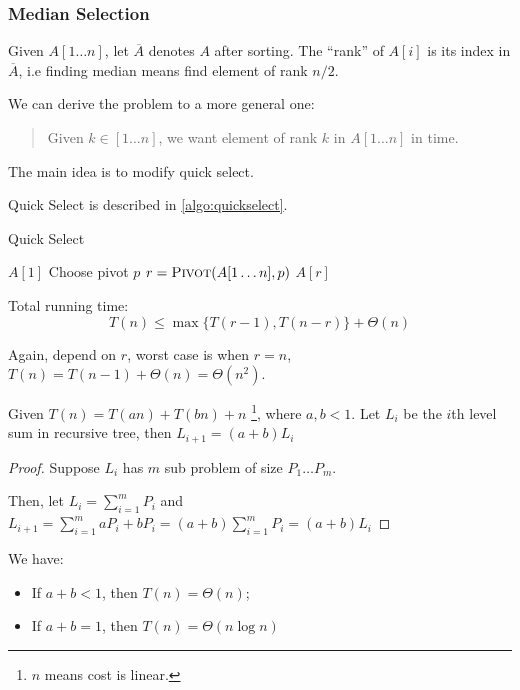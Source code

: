 \subsubsection{Median Selection}
Given $A[1 \ldots n]$, let $\overline{A}$ denotes $A$ after sorting.
The ``rank'' of $A[i]$ is its index in $\overline{A}$,
i.e finding median means find element of rank $n/2$.

We can derive the problem to a more general one:
\begin{quote}
    Given $k \in [1 \ldots n]$, we want element of rank $k$ in $A[1 \ldots n]$ in  time.
\end{quote}
The main idea is to modify quick select.

Quick Select is described in \cref{algo:quickselect}.

\begin{algorithm}[H]
    \caption{Quick Select}\label{algo:quickselect}
    \begin{algorithmic}
                \Return $A[1]$
            \Else
                \State Choose pivot $p$
                \State $r = \textsc{Pivot} (A[1 \ldots n], p)$
                    \Return {}
                    \Return {}
                \Else
                    \Return $A[r]$
                \EndIf
            \EndIf
        \EndProcedure
    \end{algorithmic}
\end{algorithm}

Total running time:
\[T(n) \leq \max\{T(r-1), T(n-r)\} + \Theta(n)\]

Again, depend on $r$, worst case is when $r=n$, $T(n) = T(n-1) + \Theta(n) = \Theta(n^2)$.

\Claim Given $T(n) = T(an) + T(bn) + n$
\footnote{$n$ means cost is linear.},
where $a,b<1$. Let $L_i$ be the $i$th level sum
in recursive tree, then $L_{i+1} = (a + b)L_i$

\begin{proof}
Suppose $L_i$ has $m$ sub problem of size $P_1 \ldots P_m$.

Then, let $\displaystyle L_i = \sum_{i=1}^m{P_i}$
and $\displaystyle L_{i+1} = \sum_{i=1}^m{aP_i+bP_i} = (a+b)\sum_{i=1}^m{P_i}=(a+b)L_i$
\end{proof}

We have:
\begin{itemize}
    \item If $a+b <1$, then $T(n) = \Theta(n)$;
    \item If $a+b =1$, then $T(n) = \Theta(n \log n)$
\end{itemize}

